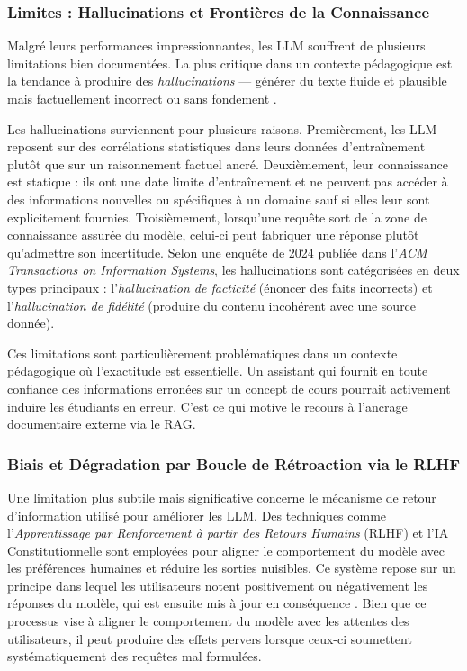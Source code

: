 \documentclass[a4paper,11pt]{article}
\begin{document}
\subsubsection{Limites : Hallucinations et Frontières de la Connaissance}

Malgré leurs performances impressionnantes, les LLM souffrent de plusieurs
limitations bien documentées. La plus critique dans un contexte pédagogique
est la tendance à produire des \emph{hallucinations} --- générer du texte
fluide et plausible mais factuellement incorrect ou sans fondement
\cite{zhang2023hallucination, huang2025hallucination}.

Les hallucinations surviennent pour plusieurs raisons. Premièrement, les LLM
reposent sur des corrélations statistiques dans leurs données d'entraînement
plutôt que sur un raisonnement factuel ancré. Deuxièmement, leur connaissance
est statique : ils ont une date limite d'entraînement et ne peuvent pas
accéder à des informations nouvelles ou spécifiques à un domaine sauf si elles
leur sont explicitement fournies. Troisièmement, lorsqu'une requête sort de la
zone de connaissance assurée du modèle, celui-ci peut fabriquer une réponse
plutôt qu'admettre son incertitude. Selon une enquête de 2024 publiée dans
l'\emph{ACM Transactions on Information Systems}, les hallucinations sont
catégorisées en deux types principaux : l'\emph{hallucination de facticité}
(énoncer des faits incorrects) et l'\emph{hallucination de fidélité} (produire
du contenu incohérent avec une source donnée).

Ces limitations sont particulièrement problématiques dans un contexte
pédagogique où l'exactitude est essentielle. Un assistant qui fournit en toute
confiance des informations erronées sur un concept de cours pourrait activement
induire les étudiants en erreur. C'est ce qui motive le recours à l'ancrage
documentaire externe via le RAG.

\subsubsection{Biais et Dégradation par Boucle de Rétroaction via le RLHF}
Une limitation plus subtile mais significative concerne le mécanisme de
retour d'information utilisé pour améliorer les LLM. Des techniques comme
l'\emph{Apprentissage par Renforcement à partir des Retours Humains} (RLHF)
et l'IA Constitutionnelle sont employées pour aligner le comportement du
modèle avec les préférences humaines et réduire les sorties nuisibles. Ce
système repose sur un principe dans lequel les utilisateurs notent positivement
ou négativement les réponses du modèle, qui est ensuite mis à jour en
conséquence \cite{ouyang2022rlhf}. Bien que ce processus vise à aligner le
comportement du modèle avec les attentes des utilisateurs, il peut produire
des effets pervers lorsque ceux-ci soumettent systématiquement des requêtes
mal formulées.
\end{document}
